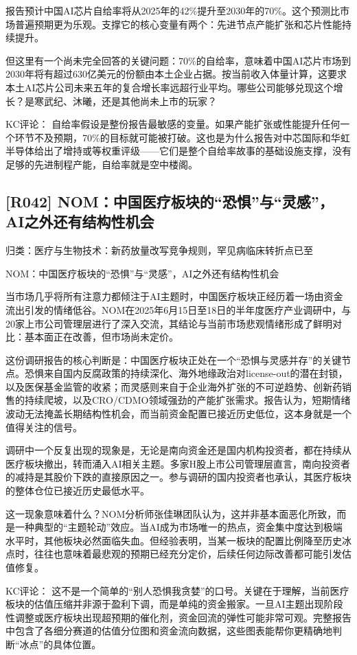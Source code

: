 \documentclass[11pt]{ctexart}
\begin{document}
报告预计中国AI芯片自给率将从2025年的42\%提升至2030年的70\%。这个预测比市场普遍预期更为乐观。支撑它的核心变量有两个：先进节点产能扩张和芯片性能持续提升。

但这里有一个尚未完全回答的关键问题：70\%的自给率，意味着中国AI芯片市场到2030年将有超过630亿美元的份额由本土企业占据。按当前收入体量计算，这要求本土AI芯片公司未来五年的复合增长率远超行业平均。哪些公司能够兑现这个增长？是寒武纪、沐曦，还是其他尚未上市的玩家？

KC评论： 自给率假设是整份报告最敏感的变量。如果产能扩张或性能提升任何一个环节不及预期，70\%的目标就可能被打破。这也是为什么报告对中芯国际和华虹半导体给出了增持或等权重评级——它们是整个自给率故事的基础设施支撑，没有足够的先进制程产能，自给率就是空中楼阁。

\subsection{[R042] NOM：中国医疗板块的“恐惧”与“灵感”，AI之外还有结构性机会}
{\small\color{refgray}归类：医疗与生物技术：新药放量改写竞争规则，罕见病临床转折点已至}

NOM：中国医疗板块的“恐惧”与“灵感”，AI之外还有结构性机会

当市场几乎将所有注意力都倾注于AI主题时，中国医疗板块正经历着一场由资金流出引发的情绪低谷。NOM在2025年6月15日至18日的半年度医疗产业调研中，与20家上市公司管理层进行了深入交流，其结论与当前市场悲观情绪形成了鲜明对比：基本面正在改善，但市场尚未定价。

这份调研报告的核心判断是：中国医疗板块正处在一个“恐惧与灵感并存”的关键节点。恐惧来自国内反腐政策的持续深化、海外地缘政治对license-out的潜在封锁，以及医保基金监管的收紧；而灵感则来自于企业海外扩张的不可逆趋势、创新药销售的持续爬坡，以及CRO/CDMO领域强劲的产能扩张需求。报告认为，短期情绪波动无法掩盖长期结构性机会，而当前资金配置已接近历史低位，这本身就是一个值得关注的信号。

调研中一个反复出现的现象是，无论是南向资金还是国内机构投资者，都在持续从医疗板块撤出，转而涌入AI相关主题。多家H股上市公司管理层直言，南向投资者的减持是其股价下跌的直接原因之一。参与调研的国内投资者也承认，其医疗板块的整体仓位已接近历史最低水平。

这一现象意味着什么？NOM分析师张佳琳团队认为，这并非基本面恶化所致，而是一种典型的“主题轮动”效应。当AI成为市场唯一的热点，资金集中度达到极端水平时，其他板块必然面临失血。但经验表明，当某一板块的配置比例降至历史冰点时，往往也意味着最悲观的预期已经充分定价，后续任何边际改善都可能引发估值修复。

KC评论： 这不是一个简单的“别人恐惧我贪婪”的口号。关键在于理解，当前医疗板块的估值压缩并非源于盈利下调，而是单纯的资金搬家。一旦AI主题出现阶段性调整或医疗板块出现超预期的催化剂，资金回流的弹性可能非常可观。完整报告中包含了各细分赛道的估值分位图和资金流向数据，这些图表能帮你更精确地判断“冰点”的具体位置。
\end{document}
